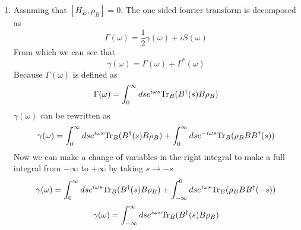 \documentclass[12pt]{article}
\newcommand{\Tr}{{\rm Tr}}
\begin{document}
\begin{enumerate}
\item Assuming that $[H_E, \rho_B] = 0$. The one sided fourier transform is decomposed as 
$$ \Gamma( \omega) = \frac{1}{2} \gamma (\omega) + i S (\omega) $$
From which we can see that 
$$ \gamma (\omega) = \Gamma (\omega) + \Gamma^* (\omega) $$
Because $\Gamma (\omega)$ is defined as 
$$ \Gamma (\omega) = \int_0^{\infty} ds e^{i \omega s} \Tr_B (B^{\dagger} (s) B \rho_B ) $$
$\gamma( \omega)$ can be rewritten as 
$$ \gamma (\omega) = \int_0^{\infty} ds e^{i \omega s} \Tr_B (B^{\dagger} (s) B \rho_B ) + \int_0^{\infty} ds e^{-i \omega s} \Tr_B (\rho_B B B^{\dagger} (s) ) $$
Now we can make a change of variables in the right integral to make a full integral from $- \infty$ to $+ \infty$ by taking $s \rightarrow - s$ 
$$ \gamma (\omega) = \int_0^{\infty} ds e^{i \omega s} \Tr_B (B^{\dagger} (s) B \rho_B ) + \int_{-\infty}^0 ds e^{i \omega s} \Tr_B (\rho_B B B^{\dagger} (-s) ) $$
$$ \gamma (\omega) = \int_{- \infty}^{\infty} ds e^{i \omega s} \Tr_B (B^{\dagger} (s) B \rho_B )  $$


\end{enumerate}
\end{document}
